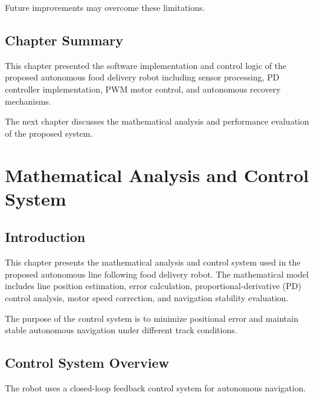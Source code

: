 \documentclass[12pt,a4paper,oneside]{report}
\begin{document}
Future improvements may overcome these limitations.


\section{Chapter Summary}

This chapter presented the software implementation and control logic of the proposed autonomous food delivery robot including sensor processing, PD controller implementation, PWM motor control, and autonomous recovery mechanisms.

The next chapter discusses the mathematical analysis and performance evaluation of the proposed system.


\chapter{Mathematical Analysis and Control System}

\section{Introduction}

This chapter presents the mathematical analysis and control system used in the proposed autonomous line following food delivery robot. The mathematical model includes line position estimation, error calculation, proportional-derivative (PD) control analysis, motor speed correction, and navigation stability evaluation.

The purpose of the control system is to minimize positional error and maintain stable autonomous navigation under different track conditions.


\section{Control System Overview}

The robot uses a closed-loop feedback control system for autonomous navigation.
\end{document}
